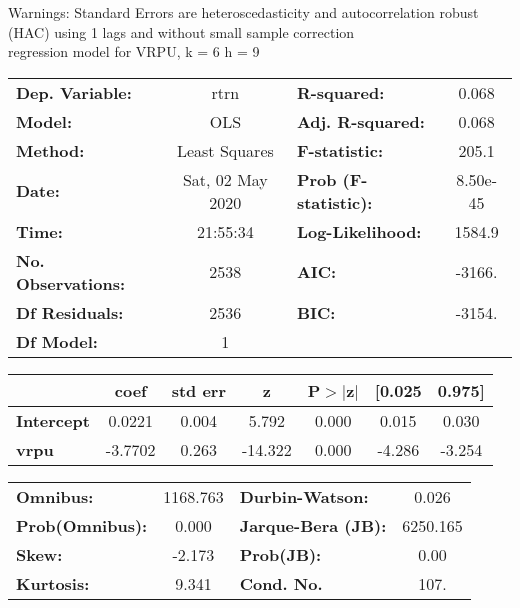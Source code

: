 Warnings: \newline
 [1] Standard Errors are heteroscedasticity and autocorrelation robust (HAC) using 1 lags and without small sample correction\\ 

regression model for VRPU, k = 6 h = 9\begin{center}
\begin{tabular}{lclc}
\toprule
\textbf{Dep. Variable:}    &       rtrn       & \textbf{  R-squared:         } &     0.068   \\
\textbf{Model:}            &       OLS        & \textbf{  Adj. R-squared:    } &     0.068   \\
\textbf{Method:}           &  Least Squares   & \textbf{  F-statistic:       } &     205.1   \\
\textbf{Date:}             & Sat, 02 May 2020 & \textbf{  Prob (F-statistic):} &  8.50e-45   \\
\textbf{Time:}             &     21:55:34     & \textbf{  Log-Likelihood:    } &    1584.9   \\
\textbf{No. Observations:} &        2538      & \textbf{  AIC:               } &    -3166.   \\
\textbf{Df Residuals:}     &        2536      & \textbf{  BIC:               } &    -3154.   \\
\textbf{Df Model:}         &           1      & \textbf{                     } &             \\
\bottomrule
\end{tabular}
\begin{tabular}{lcccccc}
                   & \textbf{coef} & \textbf{std err} & \textbf{z} & \textbf{P$> |$z$|$} & \textbf{[0.025} & \textbf{0.975]}  \\
\midrule
\textbf{Intercept} &       0.0221  &        0.004     &     5.792  &         0.000        &        0.015    &        0.030     \\
\textbf{vrpu}      &      -3.7702  &        0.263     &   -14.322  &         0.000        &       -4.286    &       -3.254     \\
\bottomrule
\end{tabular}
\begin{tabular}{lclc}
\textbf{Omnibus:}       & 1168.763 & \textbf{  Durbin-Watson:     } &    0.026  \\
\textbf{Prob(Omnibus):} &   0.000  & \textbf{  Jarque-Bera (JB):  } & 6250.165  \\
\textbf{Skew:}          &  -2.173  & \textbf{  Prob(JB):          } &     0.00  \\
\textbf{Kurtosis:}      &   9.341  & \textbf{  Cond. No.          } &     107.  \\
\bottomrule
\end{tabular}
\end{center}

